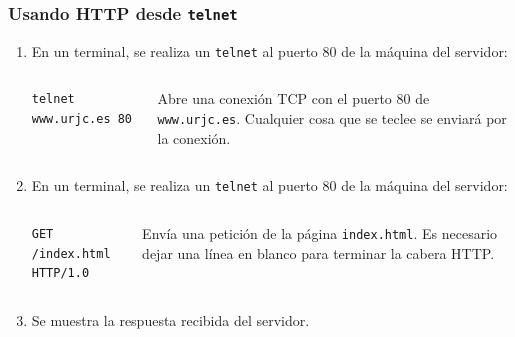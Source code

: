 \documentclass[hyperref={pdfpagelabels=true},ucs]{beamer}
\begin{document}


\begin{frame}[fragile]
\frametitle{Usando HTTP desde \texttt{telnet}}

\begin{enumerate}
\item En un terminal, se realiza un \Verb|telnet| al puerto 80 de la
  máquina del servidor:
  \begin{columns}
    \column{60mm}
    \begin{scriptsize}
      \begin{Verbatim}
telnet www.urjc.es 80        
      \end{Verbatim}
    \end{scriptsize}
    \column{60mm}
    \begin{scriptsize}
      Abre una conexión TCP con el puerto 80 de \Verb|www.urjc.es|.
      Cualquier cosa que se teclee se enviará por la conexión.
    \end{scriptsize} 
  \end{columns}

\vspace{5mm}  
\item En un terminal, se realiza un \Verb|telnet| al puerto 80 de la
  máquina del servidor:
  \begin{columns}
    \column{60mm}
    \begin{scriptsize}
      \begin{Verbatim}
GET /index.html HTTP/1.0

      \end{Verbatim}
    \end{scriptsize}
    \column{60mm}
    \begin{scriptsize}
      Envía una petición de la página \Verb|index.html|. Es necesario
      dejar una línea en blanco para terminar la cabera HTTP.
    \end{scriptsize} 
  \end{columns}

\vspace{5mm}  
\item Se muestra la respuesta recibida del servidor.
\end{enumerate}

\end{frame}

\end{document}
